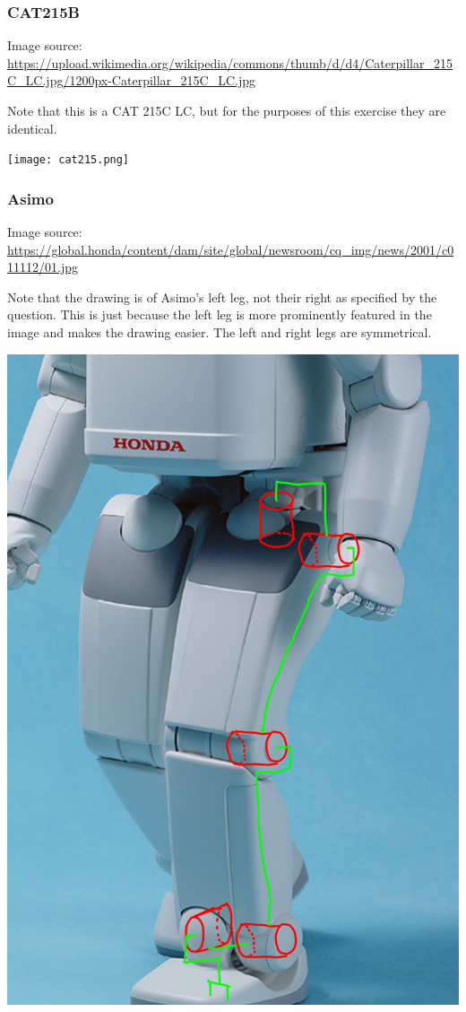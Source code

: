 \documentclass[11pt]{article}
\begin{document}
\subsubsection{CAT215B}
\label{sec:org7627076}
Image source:
\url{https://upload.wikimedia.org/wikipedia/commons/thumb/d/d4/Caterpillar\_215C\_LC.jpg/1200px-Caterpillar\_215C\_LC.jpg}

Note that this is a CAT 215C LC, but for the purposes of this exercise they are identical.

\begin{center}
\texttt{[image: cat215.png]}
\end{center}

\subsubsection{Asimo}
\label{sec:org7c39cc8}
Image source:
\url{https://global.honda/content/dam/site/global/newsroom/cq\_img/news/2001/c011112/01.jpg}

Note that the drawing is of Asimo's left leg, not their right as specified by the question.
This is just because the left leg is more prominently featured in the image and makes the drawing easier.
The left and right legs are symmetrical.

\begin{center}
\includegraphics[width=.9\linewidth]{asimo.png}
\end{center}
\end{document}
